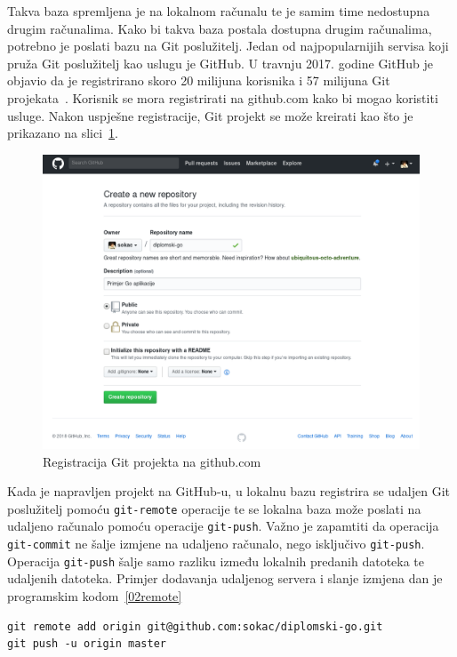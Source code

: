 Takva baza spremljena je na lokalnom računalu te je samim time nedostupna drugim računalima. Kako bi
takva baza postala dostupna drugim računalima, potrebno je poslati bazu na Git poslužitelj. Jedan od
najpopularnijih servisa koji pruža Git poslužitelj kao uslugu je GitHub.  U travnju 2017. godine
GitHub je objavio da je registrirano skoro 20 milijuna korisnika i 57 milijuna Git
projekata~\citep{github2017}. Korisnik se mora registrirati na github.com kako bi mogao koristiti
usluge. Nakon uspješne registracije, Git projekt se može kreirati kao što je prikazano na
slici~\ref{fig:02hgreg}.

\begin{figure}[h]
    \centering
    \includegraphics[width=\linewidth]{img/02/gh.png}
    \caption{Registracija Git projekta na github.com}%
    \label{fig:02hgreg}
\end{figure}

Kada je napravljen projekt na GitHub-u, u lokalnu bazu registrira se udaljen Git poslužitelj pomoću
\texttt{git-remote} operacije te se lokalna baza može poslati na udaljeno računalo pomoću operacije
\texttt{git-push}. Važno je zapamtiti da operacija \texttt{git-commit} ne šalje izmjene na udaljeno
računalo, nego isključivo \texttt{git-push}.  Operacija \texttt{git-push} šalje samo razliku između
lokalnih predanih datoteka te udaljenih datoteka.  Primjer dodavanja udaljenog servera i slanje
izmjena dan je programskim kodom~\ref{02remote}

\begin{lstlisting}[float=h]
git remote add origin git@github.com:sokac/diplomski-go.git
git push -u origin master
\end{lstlisting}

